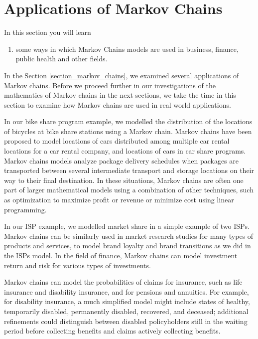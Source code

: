 \section{Applications of Markov Chains}
In this section you will learn
\begin{enumerate}
    \item some ways in which Markov Chains models are used in business, finance, public health and other fields.
\end{enumerate}


In the Section \ref{section_markov_chains}, we examined several applications of Markov chains.  Before we proceed further in our investigations of the mathematics of Markov chains in the next sections, we take the time in this section to examine how Markov chains are used in real world applications.

In our bike share program example, we modelled the distribution of the locations of bicycles at bike share stations using a Markov chain.  Markov chains have been proposed to model locations of cars distributed among multiple car rental locations for a car rental company, and locations of cars in car share programs. Markov chains models analyze package delivery schedules when packages are transported between several intermediate transport and storage locations on their way to their final destination.  In these situations, Markov chains are often one part of larger mathematical models using a combination of other techniques, such as optimization to maximize profit or revenue or minimize cost using linear programming.

In our ISP example, we modelled market share in a simple example of two ISPs.  Markov chains can be similarly used in market research studies for many types of products and services, to model brand loyalty and brand transitions as we did in the ISPs model.  In the field of finance, Markov chains can model investment return and risk for various types of investments.

Markov chains can model the probabilities of claims for insurance, such as life insurance and disability insurance, and for pensions and annuities.  For example, for disability insurance, a much simplified model might include states of healthy, temporarily disabled, permanently disabled, recovered, and deceased; additional refinements could distinguish between disabled policyholders still in the waiting period before collecting benefits and claims actively collecting benefits.

